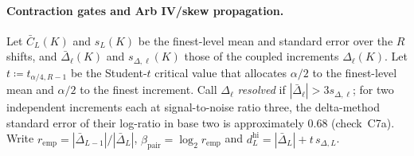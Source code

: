 \paragraph{Contraction gates and Arb IV/skew propagation.}
Let $\bar{C}_L(K)$ and $s_L(K)$ be the finest-level mean and standard error over the $R$ shifts, and $\bar{\Delta}_\ell(K)$ and $s_{\Delta,\ell}(K)$ those of the coupled increments $\Delta_\ell(K)$. Let $t\coloneqq t_{\alpha/4,R-1}$ be the Student-$t$ critical value that allocates $\alpha/2$ to the finest-level mean and $\alpha/2$ to the finest increment. Call $\Delta_\ell$ \emph{resolved} if $|\bar{\Delta}_\ell|>3s_{\Delta,\ell}$; for two independent increments each at signal-to-noise ratio three, the delta-method standard error of their log-ratio in base two is approximately $0.68$ (check~C7a). Write $r_{\mathrm{emp}}=|\bar{\Delta}_{L-1}|/|\bar{\Delta}_L|$, $\hat{\beta}_{\mathrm{pair}}=\log_2 r_{\mathrm{emp}}$ and $d_L^{\mathrm{hi}}=|\bar{\Delta}_L|+t\,s_{\Delta,L}$.


